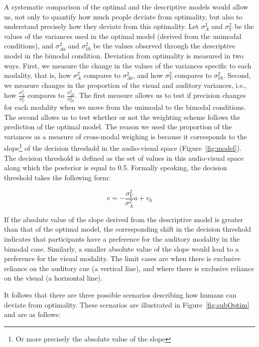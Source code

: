 \documentclass[english,man]{apa6}
\theoremstyle{definition}
\theoremstyle{definition}
\theoremstyle{definition}
\theoremstyle{remark}
\begin{document}
A systematic comparison of the optimal and the descriptive models would
allow us, not only to quantify how much people deviate from optimality,
but also to understand precisely how they deviate from this optimality.
Let \(\sigma^2_{A}\) and \(\sigma^2_{V}\) be the values of the variances
used in the optimal model (derived from the unimodal conditions), and
\(\sigma^2_{Ab}\) and \(\sigma^2_{Vb}\) be the values observed through
the descriptive model in the bimodal condition. Deviation from
optimality is measured in two ways. First, we measure the change in the
values of the variances specific to each modality, that is, how
\(\sigma^2_{A}\) compares to \(\sigma^2_{Ab}\), and how \(\sigma^2_{V}\)
compares to \(\sigma^2_{Vb}\). Second, we measure changes in the
proportion of the visual and auditory variances, i.e., how
\(\frac{\sigma^2_{A}}{\sigma^2_{V}}\) compares to
\(\frac{\sigma^2_{Ab}}{\sigma^2_{Vb}}\). The first measure allows us to
test if precision changes for each modality when we move from the
unimodal to the bimodal conditions. The second allows us to test whether
or not the weighting scheme follows the prediction of the optimal model.
The reason we used the proportion of the variances as a measure of
cross-modal weighing is because it corresponds to the
slope\footnote{Or more precisely the absolute value of the slope} of the
decision threshold in the audio-visual space (Figure~\ref{fig:model}).
The decision threshold is defined as the set of values in this
audio-visual space along which the posterior is equal to 0.5. Formally
speaking, the decision threshold takes the following form:

\[v=-\frac{\sigma^2_V}{\sigma^2_A}a+v_0\]

If the absolute value of the slope derived from the descriptive model is
greater than that of the optimal model, the corresponding shift in the
decision threshold indicates that participants have a preference for the
auditory modality in the bimodal case. Similarly, a smaller absolute
value of the slope would lead to a preference for the visual modality.
The limit cases are when there is exclusive reliance on the auditory cue
(a vertical line), and where there is exclusive reliance on the visual
(a horizontal line).

It follows that there are three possible scenarios describing how humans
can deviate from optimality. These scenarios are illustrated in
Figure~\ref{fig:subOptim} and are as follows:
\end{document}
